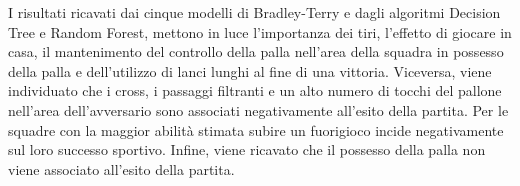 \begin{comment}
	L'analisi, attraverso strumenti grafici, inizia con lo studio dei dati individuando le possibili relazioni tra l'esito della partita e le singole 29 variabili esplicative, e le possibili interazioni tra covariate. Successivamente ad alcune operazioni di \emph{prepocessing}, l'analisi è continuata con la modellazione dei modelli Bradley-Terry. La modellazione parte con il modello Bradley-Terry standard per stimare l'abilità delle singole squadre e l'effetto di giocare in casa per poi spingersi sempre più in profondità, introducendo 26 variabili esplicative fino a analizzarne il loro effetto sulle partite per ogni singola squadra. Successivamente, per verificare che l'uso dei dati è stato svolto correttamente, si è svolto l'attività di predizione con i modelli confrontando le loro predizioni con le predizioni fatte dai \emph{bookmakers}. Per rendere il lavoro di tesi più completo e approfondito, l'analisi è passata allo studio delle predizioni fatte da metodi di apprendimento automatico ovvero, il K-Nearest-Neighbors (K-NN), la Support Vector Machine (SVM), il Decision Tree, la Random Forest e l'AdaBoost. Dopo un breve confronto tra i vari metodi di \emph{machine learning} dal punto di vista delle prestazioni registrate durante la fase di predizione, i metodi di apprendimento automatico sono stati utilizzati come riferimento dal punto di vista dell'accuratezza, della precisione, della sensibilità e della specificità, per valutare la bontà dei modelli BT in fase di predizione. Successivamente, l'analisi prosegue confrontando i metodi Decision Tree e Random Forest con i modelli BT, sull'identificazione delle statistiche che influenzano l'esito di una partita. Infine, per un maggior approfondimento, è stato riapplicato il modello BT con covariate specifiche per ogni partita e per ogni squadra, estendendo la variabile risposta da tre a cinque categorie, ottenendo un risultato più raffinato ma in linea con quanto ricavato precedentemente.\\
\end{comment}
I risultati ricavati dai cinque modelli di Bradley-Terry e dagli algoritmi Decision Tree e Random Forest, mettono in luce l'importanza dei tiri, l'effetto di giocare in casa, il mantenimento del controllo della palla nell'area della squadra in possesso della palla e dell'utilizzo di lanci lunghi al fine di una vittoria. Viceversa, viene individuato che i cross, i passaggi filtranti e un alto numero di tocchi del pallone nell'area dell’avversario sono associati negativamente all'esito della partita. Per le squadre con la maggior abilità stimata subire un fuorigioco incide negativamente sul loro successo sportivo. Infine, viene ricavato che il possesso della palla non viene associato all'esito della partita.\\
